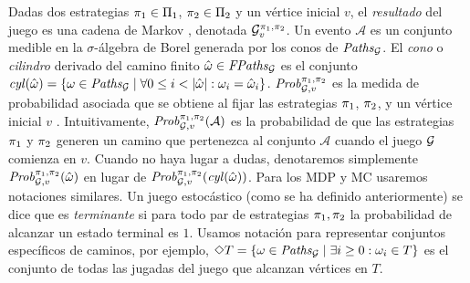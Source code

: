 Dadas dos estrategias $\pi_{1} \in \Pi_{1}$, $\pi_{2} \in \Pi_{2}$ y un vértice inicial $v$,  el \emph{resultado} del juego es una cadena de Markov \cite{ChatterjeeH12}, denotada 
$\mathcal{G}^{\pi_{1}, \pi_{2}}_v$. Un evento $\mathcal{A}$ es un conjunto medible en la $\sigma$-álgebra de Borel generada por los conos de $\mathit{Paths}_{\mathcal{G}}$. El \emph{cono} o \emph{cilindro} derivado del camino finito $\hat{\omega} \in \mathit{FPaths}_{\mathcal{G}}$ es el conjunto $\mathit{cyl}(\hat{\omega})=\{\omega \in \mathit{Paths}_{\mathcal{G}} \mid \forall 0 \leq i < |\hat{\omega}|: \omega_i = \hat{\omega}_i \}$. $\mathit{Prob}^{\pi_{1}, \pi_{2}}_{\mathcal{G},v}$ es la medida de probabilidad asociada que se obtiene al fijar las estrategias $\pi_{1}$, $\pi_{2}$, y un vértice inicial $v$  \cite{ChatterjeeH12}. Intuitivamente, $\mathit{Prob}^{\pi_{1}, \pi_{2}}_{\mathcal{G},v}(\mathcal{A})$
es la probabilidad de que las estrategias $\pi_{1}$ y $\pi_{2}$ generen un camino que pertenezca al conjunto $\mathcal{A}$ cuando el juego $\mathcal{G}$ comienza en $v$. Cuando no haya lugar a dudas, denotaremos simplemente $\mathit{Prob}^{\pi_{1}, \pi_{2}}_{\mathcal{G},v}(\hat{\omega})$ en lugar de $\mathit{Prob}^{\pi_{1}, \pi_{2}}_{\mathcal{G},v}(\mathit{cyl}(\hat{\omega}))$.
Para los MDP y MC usaremos notaciones similares. Un juego estocástico (como se ha definido anteriormente) se dice que es \emph{terminante} \cite{Condon92} si para todo par de estrategias $\pi_{1}, \pi_{2}$ la probabilidad de alcanzar un estado terminal es $1$. Usamos notación {\LTL} para representar conjuntos específicos de caminos, por ejemplo, $\Diamond T = \{\omega \in \mathit{Paths}_{\mathcal{G}} \mid \exists i \geq 0 : \omega_i \in T \}$ es el conjunto de todas las jugadas del juego que alcanzan vértices en $T$.




